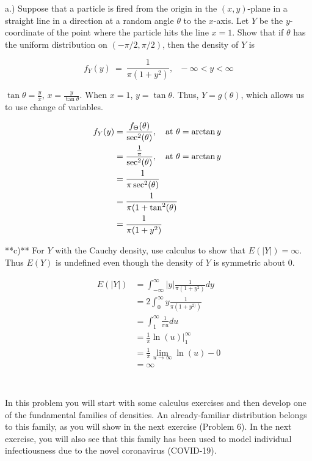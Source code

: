 \documentclass{report}
\begin{document}
\newpage
a.) 
 Suppose that a particle is fired from the origin in the $(x, y)$-plane in a straight line in a direction at a random angle $\theta$ to the $x$-axis. Let $Y$ be the $y$-coordinate of the point where the particle hits the line $x = 1$. Show that if $\theta$ has the uniform distribution on $(-\pi/2, \pi/2)$, then the density of $Y$ is

$$
f_Y(y) ~ = ~ \frac{1}{\pi(1 + y^2)}, ~~~ - \infty < y < \infty
$$

$\tan \theta = \frac{y}{x}$, $ x= \frac{y}{\tan \theta} $. When $ x=1 $, $ y=\tan \theta $. Thus, $ Y = g(\theta) $, which allows us to use change of variables. 


\begin{align*}
	f_{Y}(y) &= \frac{f_{\Theta}(\theta)}{\sec^{2}(\theta)}, \quad \text{at $ \theta = \arctan y $ } \\
	&= \frac{\frac{1}{\pi}}{\sec^{2}(\theta)}, \quad \text{at $\theta = \arctan y$} \\
	&=  \frac{1}{\pi \sec^{2}(\theta)}\\
	&= \frac{1}{\pi (1 + \tan^{2}(\theta)} \\
	&= \frac{1}{\pi(1 + y^{2})} \\
\end{align*}


**c)** For $Y$ with the Cauchy density, use calculus to show that $E(\lvert Y \rvert ) = \infty$. Thus $E(Y)$ is undefined even though the density of $Y$ is symmetric about 0.

\begin{align*}
	E(\lvert  Y \rvert ) &= \int_{-\infty}^{\infty} \lvert y \rvert \frac{1}{\pi (1+y^{2})} dy\\
		&= 2\int_{0}^{\infty } y \frac{1}{\pi (1+y^{2)})}\\
		&=  \int_{1}^{\infty }\frac{1}{\pi u}du \\
		&= \frac{1}{\pi} \ln(u) \rvert_{1}^{\infty }  \\
		&= \frac{1}{\pi} \lim_{u\to \infty } \ln(u) - 0 \\
		&= \infty  \\
\end{align*}

\newpage
\section{}
In this problem you will start with some calculus exercises and then develop one of the fundamental families of densities. An already-familiar distribution belongs to this family, as you will show in the next exercise (Problem 6). In the next exercise, you will also see that this family has been used to model individual infectiousness due to the novel coronavirus (COVID-19).
\end{document}
